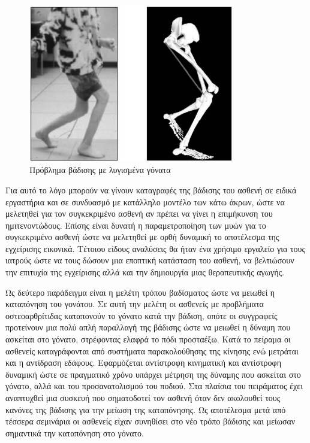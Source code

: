 \begin{figure}[H]
    \centering
    \includegraphics[width=0.8\textwidth, keepaspectratio]{fig/crouch-gait.png}
    \caption{Πρόβλημα βάδισης με λυγισμένα γόνατα \cite{arnolda06}}
    \label{fig:crouch-gait}
\end{figure}

Για αυτό το λόγο μπορούν να γίνουν καταγραφές της βάδισης του ασθενή σε ειδικά εργαστήρια και σε συνδυασμό με κατάλληλο μοντέλο των κάτω άκρων, ώστε να μελετηθεί για τον συγκεκριμένο ασθενή αν πρέπει να γίνει η επιμήκυνση του ημιτενοντώδους. Επίσης είναι δυνατή η παραμετροποίηση των μυών για το συγκεκριμένο ασθενή ώστε να μελετηθεί με ορθή δυναμική το αποτέλεσμα της εγχείρισης εικονικά. Τέτοιου είδους αναλύσεις θα ήταν ένα χρήσιμο εργαλείο για τους ιατρούς ώστε να τους δώσουν μια εποπτική κατάσταση του ασθενή, να βελτιώσουν την επιτυχία της εγχείρισης αλλά και την δημιουργία μιας θεραπευτικής αγωγής.

Ως δεύτερο παράδειγμα \cite{fregly07} είναι η μελέτη τρόπου βαδίσματος ώστε να μειωθεί η καταπόνηση του γονάτου. Σε αυτή την μελέτη οι ασθενείς με προβλήματα οστεοαρθρίτιδας καταπονούν το γόνατο κατά την βάδιση, οπότε οι συγγραφείς προτείνουν μια πολύ απλή παραλλαγή της βάδισης ώστε να μειωθεί η δύναμη που ασκείται στο γόνατο, στρέφοντας ελαφρά το πόδι προσταέξω. Κατά το πείραμα οι ασθενείς καταγράφονται από συστήματα παρακολούθησης της κίνησης ενώ μετράται και η αντίδραση εδάφους. Εφαρμόζεται αντίστροφη κινηματική και αντίστροφη δυναμική ώστε σε πραγματικό χρόνο υπάρχει μέτρηση της δύναμης που ασκείται στο γόνατο, αλλά και του προσανατολισμού του ποδιού. Στα πλαίσια του πειράματος έχει αναπτυχθεί μια συσκευή που σηματοδοτεί τον ασθενή όταν δεν ακολουθεί τους κανόνες της βάδισης για την μείωση της καταπόνησης. Ως αποτέλεσμα μετά από τέσσερα σεμινάρια οι ασθενείς είχαν συνηθίσει στο νέο τρόπο βάδισης και μείωσαν σημαντικά την καταπόνηση στο γόνατο.

